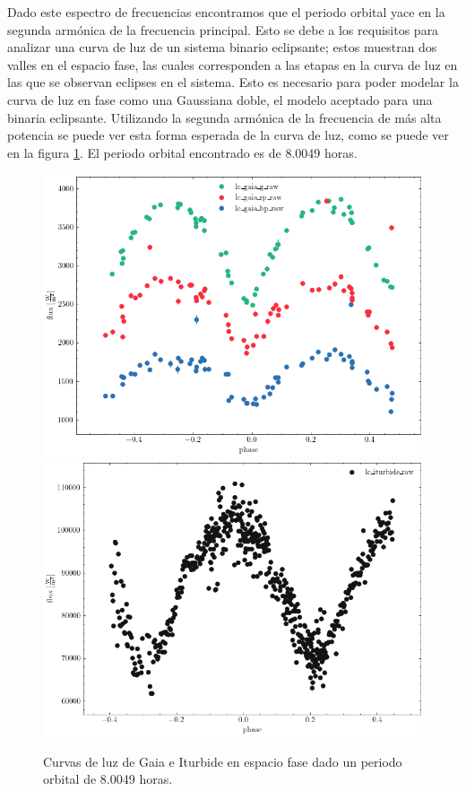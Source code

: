 Dado este espectro de frecuencias encontramos que el periodo orbital yace en la
segunda armónica de la frecuencia principal. Esto se debe a los requisitos para
analizar una curva de luz de un sistema binario eclipsante; estos muestran dos
valles en el espacio fase, las cuales corresponden a las etapas en la curva de
luz en las que se observan eclipses en el sistema. Esto es necesario para poder
modelar la curva de luz en fase como una Gaussiana doble, el modelo aceptado
para una binaria eclipsante. %
Utilizando la segunda armónica de la frecuencia de más alta potencia se puede
ver esta forma esperada de la curva de luz, como se puede ver en la figura
\ref{gaiaIturbidePhaseFold}. El periodo orbital encontrado es de 8.0049 horas.

\begin{figure}[!ht]
	\centering
	\includegraphics[scale=0.8]{Metodologia/Secciones/AnalisisPeriodo/Figures/Gaia Phase-Folded.png}
	\includegraphics[scale=0.8]{Metodologia/Secciones/AnalisisPeriodo/Figures/Iturbide Phase-Folded.png}

	\caption{Curvas de luz de Gaia e Iturbide en espacio fase dado un periodo orbital de 8.0049 horas.}
	\label{gaiaIturbidePhaseFold}
\end{figure}